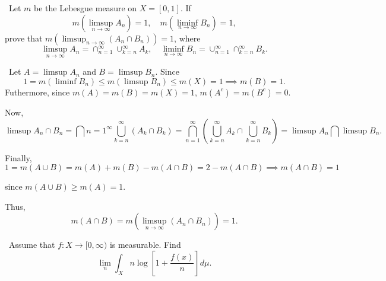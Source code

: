 \documentclass[12pt]{Homework}
\begin{document}
\begin{problem} $\,$
Let $m$ be the Lebesgue measure on $X=[0,1].$ If $$m(\limsup_{n\to\infty} A_n)=1,\quad m(\liminf_{n\to\infty} B_n)=1,$$ prove that $\displaystyle m\left(\limsup_{n\to\infty}(A_n\cap B_n)\right)=1$, where $$\limsup_{n\to\infty} A_n=\cap_{n=1}^\infty\cup_{k=n}^\infty A_k,\quad \liminf_{n\to\infty} B_n=\cup_{n=1}^\infty\cap_{k=n}^\infty B_k.$$
\end{problem}


\begin{solution}$\,$
Let $A=\limsup A_n$ and $B=\limsup B_n$. Since $$1=m(\liminf B_n)\le m(\limsup B_n)\le m(X)=1\implies m(B)=1.$$ Futhermore, since $m(A)=m(B)=m(X)=1$, $m(A^c)=m(B^c)=0$.

Now, $$\limsup A_n\cap B_n=\bigcap{n=1}^\infty\bigcup_{k=n}^\infty(A_k\cap B_k)=\bigcap_{n=1}^\infty\left(\bigcup_{k=n}^\infty A_k\cap\bigcup_{k=n}^\infty B_k\right)=\limsup A_n\bigcap \limsup B_n.$$

Finally, $$1=m(A\cup B)=m(A)+m(B)-m(A\cap B)=2-m(A\cap B)\implies m(A\cap B)=1$$

since $m(A\cup B)\ge m(A)=1.$

Thus, $$m(A\cap B)=m\left(\limsup_{n\to\infty}(A_n\cap B_n)\right)=1.$$
\end{solution}
\newpage

\begin{problem} $\,$
Assume that $f:X\to[0,\infty)$ is measurable. Find $$\lim_n\int_X n\log\left[1+\frac{f(x)}{n}\right]d\mu.$$
\end{problem}
\end{document}
